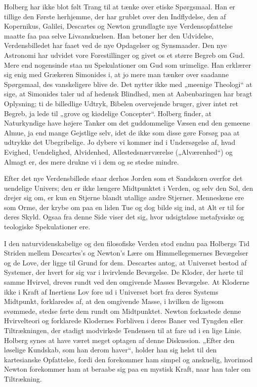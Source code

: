 \documentclass[12pt,a4paper,openany]{book}
\newcommand{\opage}[1]{\marginnote{\footnotesize\textit{[#1]}}}
\begin{document}
Holberg har ikke blot følt Trang til at tænke over etiske Spørgsmaal. Han er
tillige den Første herhjemme, der har grublet over den Indflydelse, den af
Kopernikus, Galilei, Descartes og Newton grundlagte nye Verdensopfattelse
maatte faa paa selve Livsanskuelsen. Han betoner her den Udvidelse,
Verdensbilledet har faaet ved de nye Opdagelser og Synsmaader. Den nye
Astronomi har udvidet vore Forestillinger og givet os et større Begreb om Gud.
Mere end nogensinde staa nu Spekulationer om Gud som urimelige. Han erklærer
sig enig med Grækeren Simonides i, at jo mere man tænker over saadanne
Spørgsmaal, des vanskeligere blive de. Det nytter ikke med „meenige Theologi“
at sige, at Simonides taler ud af hedensk Blindhed, men at Aabenbaringen har
bragt Oplysning; ti de billedlige Udtryk, Bibelen overvejende bruger, giver
intet ret Begreb, ja lede til „grove og kiødelige Concepter“. Holberg finder,
at Naturkyndige have højere Tanker om det guddommelige Væsen end den gemeene
Almue, ja end mange Gejstlige selv, idet de ikke som disse gøre Forsøg paa at
udtrykke det Ubegribelige. Jo dybere vi kommer ind i Undersøgelse af, hvad
Evighed, Uendelighed, Alvidenhed, Allestedsnærværelse („Alværenhed“) og Almagt
er, des mere drukne vi i dem og se stedse mindre.

\setcounter{footnote}{0}%
\opage{13}Efter det nye Verdensbillede staar derhos Jorden som et Sandskorn
overfor det uendelige Univers; den er ikke længere Midtpunktet i Verden, og
selv den Sol, den drejer sig om, er kun en Stjerne blandt utallige andre
Stjerner. Menneskene ere som Orme, der krybe om paa en liden Tue og dog bilde
sig ind, at Alt er til for deres Skyld. Ogsaa fra denne Side viser det sig,
hvor udsigtsløse metafysiske og teologiske Spekulationer ere.

I den naturvidenskabelige og den filosofiske Verden stod endnu paa Holbergs Tid
Striden mellem Descartes's og Newton's Lære om Himmellegemernes Bevægelser og
de Love, der ligge til Grund for dem. Descartes antog, at Universet bestod af
Systemer, der hvert for sig var i hvirvlende Bevægelse. De Kloder, der hørte
til samme Hvirvel, dreves rundt ved den omgivende Masses Bevægelse. At Kloderne
ikke i Kraft af Inertiens Lov fore ud i Universet bort fra deres Systems
Midtpunkt, forklaredes af, at den omgivende Masse, i hvilken de ligesom
svømmede, stedse førte dem rundt om Midtpunktet. Newton forkastede denne
Hvirvelteori og forklarede Klodernes Forbliven i deres Baner ved Tyngden eller
Tiltrækningen, der stadigt modvirkede Tendensen til at fare ud i en lige Linie.
Holberg synes at have været meget optagen af denne Diskussion. „Efter den
løselige Kundskab, som han derom haver“, holder han sig helst til den
kartesianske Opfattelse, fordi den forekommer ham simpel og anskuelig, hvorimod
Newton forekommer ham at beraabe sig paa en mystisk Kraft, naar han taler om
Tiltrækning.
\end{document}
